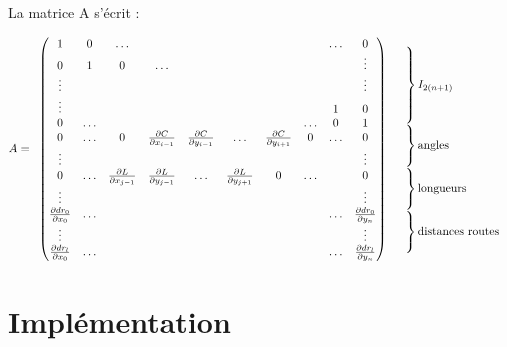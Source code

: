 \documentclass[11pt]{article}
\begin{document}
La matrice A s'écrit :

$$A=\begin{array}{cc} 
\begin{pmatrix}  
1      & 0      &\ldots &       & & & &          & \ldots & 0 \\
0      & 1      & 0     &\ldots & & & &          &        & \vdots \\
\vdots &        &       &       & & & &          &        & \vdots \\
\vdots &        &       &       & & & &          & 1      & 0 \\
0      & \ldots &       &       & & & & \ldots   & 0      & 1 \\
0      & \ldots & 0 &\frac{\partial C}{\partial x_{i-1}} & \frac{\partial C}{\partial y_{i-1}} & \ldots& \frac{\partial C}{\partial y_{i+1}}& 0 & \ldots & 0 \\
\vdots &        &       &       & & & &          &        & \vdots \\
0      & \ldots & \frac{\partial L}{\partial x_{j-1}} & \frac{\partial L}{\partial y_{j-1}} & \ldots& \frac{\partial L}{\partial y_{j+1}}& 0 & \ldots & & 0 \\
\vdots &        &       &       & & & &          &        & \vdots \\
\frac{\partial dr_0}{\partial x_{0}}  & \ldots & &  & &  & & & \ldots & \frac{\partial dr_0}{\partial y_{n}} \\
\vdots &        &       &       & & & &          &        & \vdots \\       
\frac{\partial dr_l}{\partial x_{0}}  & \ldots & &  & &  & & & \ldots & \frac{\partial dr_l}{\partial y_{n}} \\
\end{pmatrix} 
&  \begin{array}{l} 
\left. \rule{0pt}{8.5ex} \right\} \text{$I_{2(n+1)}$} \\
\left. \rule{0pt}{5ex} \right\} \text{angles}\\
\left. \rule{0pt}{5ex} \right\} \text{longueurs}\\ 
\left. \rule{0pt}{5ex} \right\} \text{distances routes}\\ 
\end{array}\\ 
\end{array}$$

\section{Implémentation}
\end{document}
